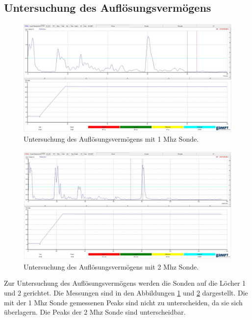 \subsection{Untersuchung des Auflösungsvermögens}
\label{sec:Aufloesung}

\begin{figure}[H]
    \centering
    \includegraphics[width=\textwidth]{img/Aufloesung_1Mhz.png}
    \caption{Untersuchung des Auflösungsvermögens mit 1 Mhz Sonde.}
    \label{fig:Aufloesung1Mhz}
\end{figure}


\begin{figure}[H]
    \centering
    \includegraphics[width=\textwidth]{img/Aufloesung_2Mhz.png}
    \caption{Untersuchung des Auflösungsvermögens mit 2 Mhz Sonde.}
    \label{fig:Aufloesung2Mhz}
\end{figure}

Zur Untersuchung des Auflösungsvermögens werden die Sonden auf die Löcher 1 und 2 gerichtet.
Die Messungen sind in den Abbildungen \ref{fig:Aufloesung1Mhz} und \ref{fig:Aufloesung2Mhz} dargestellt.
Die mit der 1 Mhz Sonde gemessenen Peaks sind nicht zu unterscheiden, da sie sich überlagern.
Die Peaks der 2 Mhz Sonde sind unterscheidbar. 
\newpage

